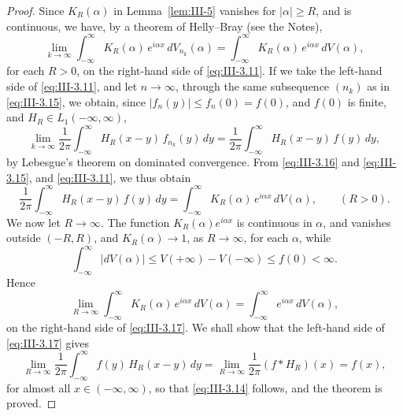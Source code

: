 \begin{proof}
Since $K_{R}(\alpha)$ in Lemma~\ref{lem:III-5} vanishes for $|\alpha|\ge R$, and is continuous, we have, by a theorem of Helly--Bray (see the Notes),
\begin{equation}\tag{3.15}\label{eq:III-3.15}
\lim_{k\to\infty}\int_{-\infty}^{\infty}K_{R}(\alpha)\,e^{i\alpha x}\,dV_{n_{k}}(\alpha)
=\int_{-\infty}^{\infty}K_{R}(\alpha)\,e^{i\alpha x}\,dV(\alpha),
\end{equation}
for each $R>0$, on the right-hand side of \eqref{eq:III-3.11}. If we take the left-hand side of \eqref{eq:III-3.11}, and let $n\to\infty$, through the same subsequence $(n_{k})$ as in \eqref{eq:III-3.15}, we obtain, since $|f_{n}(y)|\le f_{n}(0)=f(0)$, and $f(0)$ is finite, and $H_{R}\in L_{1}(-\infty,\infty)$,
\begin{equation}\tag{3.16}\label{eq:III-3.16}
\lim_{k\to\infty}\frac{1}{2\pi}\int_{-\infty}^{\infty}H_{R}(x-y)\,f_{n_{k}}(y)\,dy
=\frac{1}{2\pi}\int_{-\infty}^{\infty}H_{R}(x-y)\,f(y)\,dy,
\end{equation}
by Lebesgue's theorem on dominated convergence. From \eqref{eq:III-3.16} and \eqref{eq:III-3.15}, and \eqref{eq:III-3.11}, we thus obtain
\begin{equation}\tag{3.17}\label{eq:III-3.17}
\frac{1}{2\pi}\int_{-\infty}^{\infty}H_{R}(x-y)\,f(y)\,dy
=\int_{-\infty}^{\infty}K_{R}(\alpha)\,e^{i\alpha x}\,dV(\alpha),\qquad(R>0).
\end{equation}
We now let $R\to\infty$. The function $K_{R}(\alpha)e^{i\alpha x}$ is continuous in $\alpha$, and vanishes outside $(-R,R)$, and $K_{R}(\alpha)\to1$, as $R\to\infty$, for each $\alpha$, while
\[
\int_{-\infty}^{\infty}\bigl|dV(\alpha)\bigr|\le V(+\infty)-V(-\infty)\le f(0)<\infty.
\]
Hence
\begin{equation}\tag{3.18}\label{eq:III-3.18}
\lim_{R\to\infty}\int_{-\infty}^{\infty}K_{R}(\alpha)\,e^{i\alpha x}\,dV(\alpha)
=\int_{-\infty}^{\infty}e^{i\alpha x}\,dV(\alpha),
\end{equation}
on the right-hand side of \eqref{eq:III-3.17}. We shall show that the left-hand side of \eqref{eq:III-3.17} gives
\begin{equation}\tag{3.19}\label{eq:III-3.19}
\lim_{R\to\infty}\frac{1}{2\pi}\int_{-\infty}^{\infty}f(y)\,H_{R}(x-y)\,dy
=\lim_{R\to\infty}\frac{1}{2\pi}(f*H_{R})(x)=f(x),
\end{equation}
for almost all $x\in(-\infty,\infty)$, so that \eqref{eq:III-3.14} follows, and the theorem is proved.


\end{proof}

